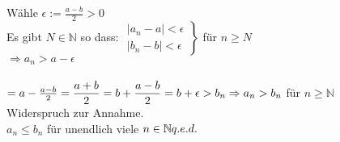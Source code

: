 Wähle $\epsilon := \displaystyle\frac{a - b}{2} > 0$\\
Es gibt $N \in \mathbb{N}$ so dass:
$
\left.
\begin{array}{ll}
\mid a_n - a \mid  < \epsilon \\
\mid b_n - b \mid  < \epsilon
\end{array} \right\rbrace$ für $n \geq N$\\
$\Rightarrow a_n > a - \epsilon$\\ \\
$= a - \frac{a - b}{2} = \displaystyle\frac{a + b}{2} = b + \displaystyle\frac{a - b}{2}\\
\\
= b + \epsilon > b_n \Rightarrow a_n > b_n$ für $n \geq \mathbb{N}$\\
Widerspruch zur Annahme.\\
$a_n \leq b_n$ für unendlich viele $n \in \mathbb{N} \hfill q.e.d.$

